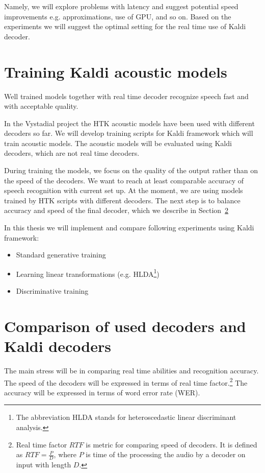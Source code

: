 Namely, we will explore problems with latency and suggest potential speed improvements e.g. approximations, use of GPU, and so on. Based on the experiments we will suggest the optimal setting for the real time use of Kaldi decoder.


\section{Training Kaldi acoustic models} 
\label{sec:training_kaldi_acoustic_models}
Well trained models together with real time decoder recognize speech fast and with acceptable quality.

In the Vystadial project the HTK acoustic models have been used with different decoders so far. We will develop training scripts for Kaldi framework which will train acoustic models. The acoustic models will be evaluated using Kaldi decoders, which are not real time decoders. 

During training the models, we focus on the quality of the output rather than on the speed of the decoders. We want to reach at least comparable accuracy of speech recognition with current set up. At the moment, we are using models trained by HTK scripts with different decoders. The next step is to balance accuracy and speed of the final decoder, which we describe in Section~\ref{sec:compare_rt}

In this thesis we will implement and compare following experiments using Kaldi framework:
\begin{itemize}
    \item Standard generative training
    \item Learning linear transformations (e.g. HLDA\footnote{The abbreviation HLDA stands for heteroscedastic linear discriminant analysis.})
    \item Discriminative training 
\end{itemize}

 

\section{Comparison of used decoders and Kaldi decoders} 
\label{sec:compare_rt}
The main stress will be in comparing real time abilities and recognition accuracy. The speed of the decoders will be expressed in terms of real time factor.\footnote{Real time factor $RTF$ is metric for comparing speed of decoders. It is defined as $RTF = \frac{P}{D}$, where $P$ is time of the processing the audio by a decoder on input with length $D$.} The accuracy will be expressed in terms of word error rate (WER).

